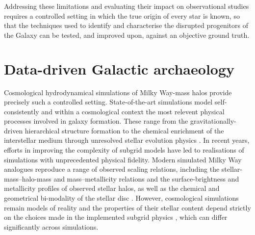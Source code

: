 Addressing these limitations and evaluating their impact on observational studies requires a controlled
setting in which the true origin of every star is known,
so that the techniques used to identify and characterise the disrupted progenitors of the Galaxy can be tested,
and improved upon, against an objective ground truth.


\section{Data-driven Galactic archaeology}
\label{sec:intro_ml}

Cosmological hydrodynamical simulations of Milky Way-mass halos provide precisely such a controlled setting.
State-of-the-art simulations model self-consistently and within a cosmological context
the most relevent physical processes involved in galaxy formation. These range
from the gravitationally-driven hierarchical structure formation to the chemical enrichment 
of the interstellar medium through unresolved stellar evolution physics \citep[e.g. see review of][]{Crain2023}. 
In recent years, efforts in improving the complexity of subgrid models have led to realisations of simulations with unprecedented physical
fidelity.  Modern simulated Milky Way analogues reproduce a range of observed scaling relations,
including the stellar-mass--halo-mass and
mass--metallicity relations and the surface-brightness and metallicity profiles of observed stellar
halos, as well as the chemical and geometrical bi-modality of the stellar disc
\citep{Grand2017,Hopkins2018,Monachesi2019,Font2020,Buck2020,Agertz2021}.
However, cosmological simulations remain models of reality and the properties of
their stellar content depend strictly on the choices made in the implemented subgrid physics \citep{Kim2014,Crain2015}, which can differ
significantly across simulations.

